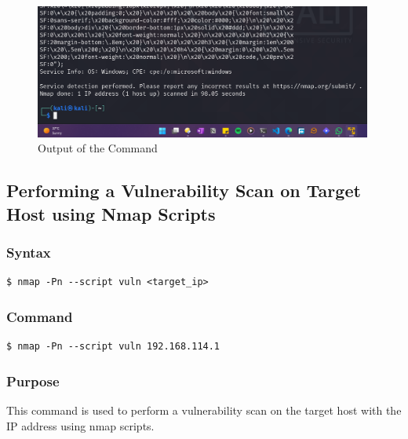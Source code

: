 \documentclass[11pt]{article}
\begin{document}
\begin{figure}[H]
    \centering
    \includegraphics[width=0.99\textwidth]{a3_ss (10).png}
    \caption{Output of the Command}
\end{figure}

\subsection{Performing a Vulnerability Scan on Target Host using Nmap Scripts}

\subsubsection*{Syntax}
\begin{verbatim}
$ nmap -Pn --script vuln <target_ip>
\end{verbatim}

\subsubsection*{Command}
\begin{verbatim}
$ nmap -Pn --script vuln 192.168.114.1
\end{verbatim}

\subsubsection*{Purpose}
This command is used to perform a vulnerability scan on the target host with the IP address using nmap scripts.
\end{document}
